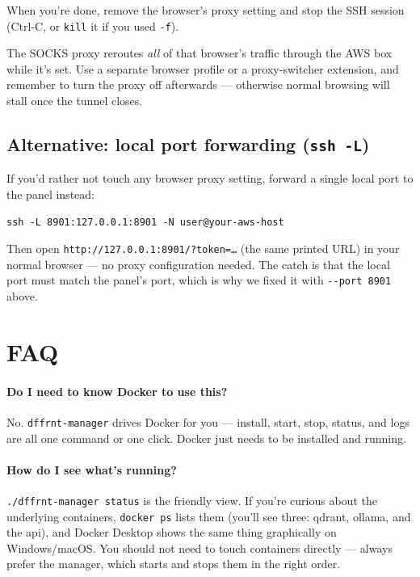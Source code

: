 \documentclass[11pt,letterpaper]{article}
\let\oldsection\section
\renewcommand{\section}{\vspace{1em}\oldsection}
\begin{document}
When you're done, remove the browser's proxy setting and stop the SSH session
(Ctrl-C, or \texttt{kill} it if you used \texttt{-f}).

\begin{gnote}
The SOCKS proxy reroutes \emph{all} of that browser's traffic through the AWS
box while it's set. Use a separate browser profile or a proxy-switcher
extension, and remember to turn the proxy off afterwards --- otherwise normal
browsing will stall once the tunnel closes.
\end{gnote}

\subsection{Alternative: local port forwarding (\texttt{ssh -L})}

If you'd rather not touch any browser proxy setting, forward a single local
port to the panel instead:

\begin{lstlisting}
ssh -L 8901:127.0.0.1:8901 -N user@your-aws-host
\end{lstlisting}

Then open \texttt{http://127.0.0.1:8901/?token=\ldots} (the same printed URL)
in your normal browser --- no proxy configuration needed. The catch is that
the local port must match the panel's port, which is why we fixed it with
\texttt{-{}-port 8901} above.

\section{FAQ}

\paragraph{Do I need to know Docker to use this?}
No. \texttt{dffrnt-manager} drives Docker for you --- install, start, stop,
status, and logs are all one command or one click. Docker just needs to be
installed and running.

\paragraph{How do I see what's running?}
\texttt{./dffrnt-manager status} is the friendly view. If you're curious
about the underlying containers, \texttt{docker ps} lists them (you'll see
three: qdrant, ollama, and the api), and Docker Desktop shows the same thing
graphically on Windows/macOS. You should not need to touch containers
directly --- always prefer the manager, which starts and stops them in the
right order.
\end{document}
